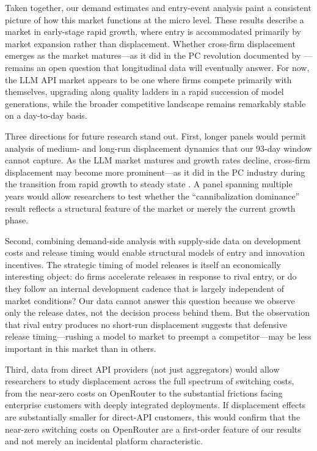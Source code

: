 \documentclass[11pt, a4paper]{article}
\begin{document}
Taken together, our demand estimates and entry-event analysis paint a consistent picture of how this market functions at the micro level. These results describe a market in early-stage rapid growth, where entry is accommodated primarily by market expansion rather than displacement. Whether cross-firm displacement emerges as the market matures---as it did in the PC revolution documented by \citet{bresnahan1999technological}---remains an open question that longitudinal data will eventually answer. For now, the LLM API market appears to be one where firms compete primarily with themselves, upgrading along quality ladders in a rapid succession of model generations, while the broader competitive landscape remains remarkably stable on a day-to-day basis.

Three directions for future research stand out. First, longer panels would permit analysis of medium- and long-run displacement dynamics that our 93-day window cannot capture. As the LLM market matures and growth rates decline, cross-firm displacement may become more prominent---as it did in the PC industry during the transition from rapid growth to steady state \citep{bresnahan1999technological}. A panel spanning multiple years would allow researchers to test whether the ``cannibalization dominance'' result reflects a structural feature of the market or merely the current growth phase.

Second, combining demand-side analysis with supply-side data on development costs and release timing would enable structural models of entry and innovation incentives. The strategic timing of model releases is itself an economically interesting object: do firms accelerate releases in response to rival entry, or do they follow an internal development cadence that is largely independent of market conditions? Our data cannot answer this question because we observe only the release dates, not the decision process behind them. But the observation that rival entry produces no short-run displacement suggests that defensive release timing---rushing a model to market to preempt a competitor---may be less important in this market than in others.

Third, data from direct API providers (not just aggregators) would allow researchers to study displacement across the full spectrum of switching costs, from the near-zero costs on OpenRouter to the substantial frictions facing enterprise customers with deeply integrated deployments. If displacement effects are substantially smaller for direct-API customers, this would confirm that the near-zero switching costs on OpenRouter are a first-order feature of our results and not merely an incidental platform characteristic.
\end{document}
